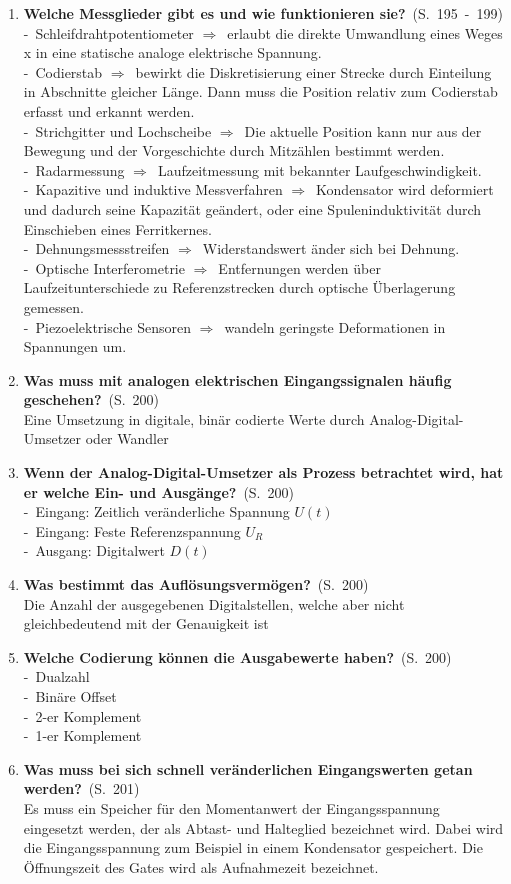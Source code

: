 \documentclass[a4paper,12pt]{article}
\newcommand{\question}[3]{\pagebreak[3]\item {\textbf{#1?}}\ (S.\ #2)#3}
\newcommand{\catchword}[1]{\\-\ #1}
\newcommand{\normaltext}[1]{\\#1}
\newcommand{\resultol}[1]{$\Rightarrow$\ #1}
\newcommand{\page}[1]{#1}
\newcommand{\pages}[2]{#1\ -\ #2}
\begin{document}
\begin{enumerate}
  \question{Welche Messglieder gibt es und wie funktionieren sie}{\pages{195}{199}}
  {
    \catchword{Schleifdrahtpotentiometer \resultol{erlaubt die direkte Umwandlung eines Weges x in
               eine statische analoge elektrische Spannung.}}
    \catchword{Codierstab \resultol{bewirkt die Diskretisierung einer Strecke durch Einteilung in Abschnitte 
               gleicher Länge. Dann muss die Position relativ zum Codierstab erfasst und erkannt werden.}}
    \catchword{Strichgitter und Lochscheibe \resultol{Die aktuelle Position kann nur aus der Bewegung und der 
               Vorgeschichte durch Mitzählen bestimmt werden.}}
    \catchword{Radarmessung \resultol{Laufzeitmessung mit bekannter Laufgeschwindigkeit.}}
    \catchword{Kapazitive und induktive Messverfahren \resultol{Kondensator wird deformiert und dadurch seine
               Kapazität geändert, oder eine Spuleninduktivität durch Einschieben eines Ferritkernes.}}
    \catchword{Dehnungsmessstreifen \resultol{Widerstandswert änder sich bei Dehnung.}}
    \catchword{Optische Interferometrie \resultol{Entfernungen werden über Laufzeitunterschiede
               zu Referenzstrecken durch optische Überlagerung gemessen.}}
    \catchword{Piezoelektrische Sensoren \resultol{wandeln geringste Deformationen in Spannungen um.}}
  }

  \question{Was muss mit analogen elektrischen Eingangssignalen häufig geschehen}{\page{200}}
  {
    \normaltext{Eine Umsetzung in digitale, binär codierte Werte durch Analog-Digital-Umsetzer
                oder Wandler}
  }

  \question{Wenn der Analog-Digital-Umsetzer als Prozess betrachtet wird, hat er welche Ein-
            und Ausgänge}{\page{200}}
  {
    \catchword{Eingang: Zeitlich veränderliche Spannung $U(t)$}
    \catchword{Eingang: Feste Referenzspannung $U_R$}
    \catchword{Ausgang: Digitalwert $D(t)$}
  }

  \question{Was bestimmt das Auflösungsvermögen}{\page{200}}
  {
    \normaltext{Die Anzahl der ausgegebenen Digitalstellen, welche aber nicht gleichbedeutend
                mit der Genauigkeit ist}
  }

  \question{Welche Codierung können die Ausgabewerte haben}{\page{200}}
  {
    \catchword{Dualzahl}
    \catchword{Binäre Offset}
    \catchword{2-er Komplement}
    \catchword{1-er Komplement}
  }

  \question{Was muss bei sich schnell veränderlichen Eingangswerten getan werden}{\page{201}}
  {
    \normaltext{Es muss ein Speicher für den Momentanwert der Eingangsspannung eingesetzt werden,
                der als Abtast- und Halteglied bezeichnet wird. Dabei wird die Eingangsspannung
                zum Beispiel in einem Kondensator gespeichert. Die Öffnungszeit des Gates wird
                als Aufnahmezeit bezeichnet.}
  }


\end{enumerate}
\end{document}
